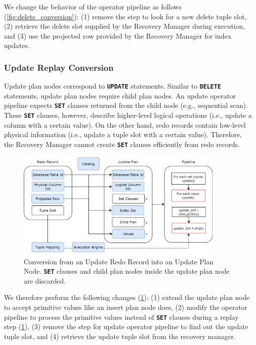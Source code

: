 \documentclass[12pt]{cmuthesis}
\newcommand{\dbSQL}[1]{\texttt{\textbf{#1}}\xspace}
\begin{document}
We change the behavior of the operator pipeline as follows (\cref{fig:delete_conversion}): (1) remove the step to look for a new delete tuple slot, (2) retrieve the delete slot supplied by the Recovery Manager during execution, and (3) use the projected row provided by the Recovery Manager for index updates.

\subsubsection{Update Replay Conversion}
\label{update_replay_conversion}

Update plan nodes correspond to \dbSQL{UPDATE} statements. Similar to \dbSQL{DELETE} statements, update plan nodes require child plan nodes. An update operator pipeline expects \dbSQL{SET} clauses returned from the child node (e.g., sequential scan). These \dbSQL{SET} clauses, however, describe higher-level logical operations (i.e., update a column with a certain value). On the other hand, redo records contain low-level physical information (i.e., update a tuple slot with a certain value). Therefore, the Recovery Manager cannot create \dbSQL{SET} clauses efficiently from redo records.

\begin{figure}[t!]
\centering
\includegraphics[width=0.9\textwidth]{images/UpdateConversion.png}
\caption{Conversion from an Update Redo Record into an Update Plan Node. \dbSQL{SET} clauses and child plan nodes inside the update plan node are discarded.}
\label{fig:update_conversion}
\end{figure}

We therefore perform the following changes (\cref{fig:update_conversion}): (1) extend the update plan node to accept primitive values like an insert plan node does, (2) modify the operator pipeline to process the primitive values instead of \dbSQL{SET} clauses during a replay step (\cref{fig:update_conversion}), (3) remove the step for update operator pipeline to find out the update tuple slot, and (4) retrieve the update tuple slot from the recovery manager.
\end{document}
